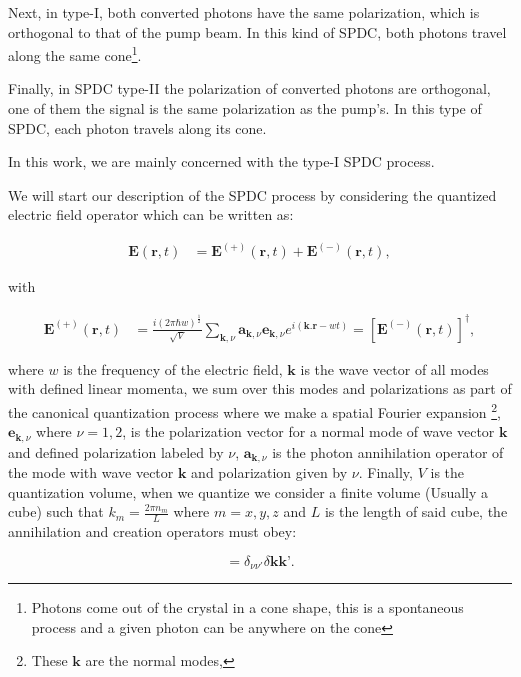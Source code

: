 \documentclass{book}
\begin{document}
Next, in type-I, both converted photons have the same polarization, which is orthogonal to that of the pump beam. In this kind of SPDC, both photons travel along the same cone\footnote{Photons come out of the crystal in a cone shape, this is a spontaneous process and a given photon can be anywhere on the cone}.

Finally, in SPDC type-II the polarization of converted photons are orthogonal, one of them the signal is the same polarization as the pump's. In this type of SPDC, each photon travels along its cone.

In this work, we are mainly concerned with the type-I SPDC process.

We will start our description of the SPDC process by considering the quantized electric field operator which can be written as:

\begin{align}
\textbf{E}(\textbf{r},t)&=\textbf{E}^{(+)} (\textbf{r},t) + \textbf{E}^{(-)} (\textbf{r},t), \label{fiel+}
\end{align}

with

\begin{align}
\textbf{E}^{(+)} (\textbf{r},t)&=\frac{i(2 \pi \hbar w)^{\frac{1}{2}}}{\sqrt{V}} \sum_{\textbf{k},\nu}  \mathbf{a}_{\textbf{k},\nu} \mathbf{e}_{\textbf{k},\nu} e^{i(\textbf{k.r}-wt)}=[\textbf{E}^{(-)} (\textbf{r},t)]^{\dagger}, \label{quanfield}
\end{align}

where $w$ is the frequency of the electric field, $\mathbf{k}$ is the wave vector of all modes with defined linear momenta, we sum over this modes and polarizations as part of the canonical quantization process where we make a spatial Fourier expansion \cite{grynberg} \footnote{These $\mathbf{k}$ are the normal modes,}, $\mathbf{e}_{\textbf{k},\nu}$ where $\nu=1,2$, is the polarization vector for a normal mode of wave vector $\mathbf{k}$ and defined polarization labeled by $\nu$, $\mathbf{a}_{\textbf{k},\nu}$ is the photon annihilation operator of the mode with wave vector $\mathbf{k}$ and polarization given by $\nu$. Finally, $V$ is the quantization volume, when we quantize we consider a finite volume (Usually a cube) such that $k_{m}=\frac{2 \pi n_{m}}{L}$ where $m=x,y,z$ and $L$ is the length of said cube, the annihilation and creation operators must obey:

\begin{equation}
[\mathbf{a}_{\textbf{k},\nu},\mathbf{a^{\dagger}}_{\textbf{k},\nu}]=\delta_{\nu \nu'}\delta\textbf{k}\textbf{k'}.
\end{equation}
\end{document}
